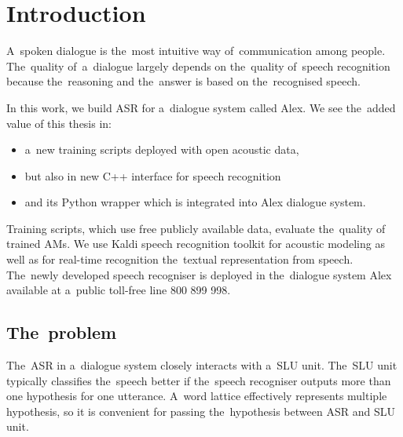 \chapter{Introduction}
\label{cha:intro}

A~spoken dialogue is the~most intuitive way of~communication among people. 
The~quality of~a~dialogue largely depends on the~quality of~speech recognition because the~reasoning and the~answer is based on the~recognised speech. 

In this work, we build \acl{ASR} for a~dialogue system called Alex. 
We see the~added value of this thesis in:
\begin{itemize}
    \item a~new training scripts deployed with open acoustic data\cite{korvas_2014}, 
    \item but also in new C++ interface for speech recognition 
    \item and its Python wrapper which is integrated into Alex dialogue system. 
\end{itemize}
Training scripts, which use free publicly available data, evaluate the~quality of trained \aclp{AM}.
We use Kaldi speech recognition toolkit\cite{povey2011kaldi} for acoustic modeling as well as for real-time recognition the~textual representation from speech.
The~newly developed speech recogniser is deployed in the~dialogue system Alex available at a~public toll-free line 800 899 998. 


\section{The~problem} 
\label{sec:problem}

The~\ac{ASR} in a~dialogue system closely interacts with a~\acl{SLU} unit.
The~\ac{SLU} unit typically classifies the~speech better if the~speech recogniser outputs more than one hypothesis for one utterance. 
A~word lattice effectively represents multiple hypothesis, so it is convenient for passing the~hypothesis between \ac{ASR} and \ac{SLU} unit.

